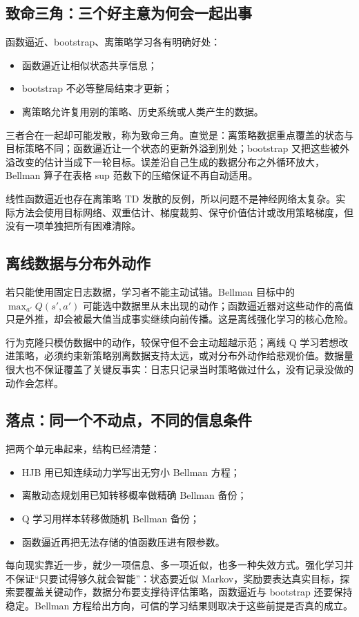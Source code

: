 \subsection{致命三角：三个好主意为何会一起出事}

函数逼近、bootstrap、离策略学习各有明确好处：

\begin{itemize}
\tightlist
\item
  函数逼近让相似状态共享信息；
\item
  bootstrap 不必等整局结束才更新；
\item
  离策略允许复用别的策略、历史系统或人类产生的数据。
\end{itemize}

三者合在一起却可能发散，称为致命三角。直觉是：离策略数据重点覆盖的状态与目标策略不同；函数逼近让一个状态的更新外溢到别处；bootstrap 又把这些被外溢改变的估计当成下一轮目标。误差沿自己生成的数据分布之外循环放大，Bellman 算子在表格 sup 范数下的压缩保证不再自动适用。

线性函数逼近也存在离策略 TD 发散的反例，所以问题不是神经网络太复杂。实际方法会使用目标网络、双重估计、梯度裁剪、保守价值估计或改用策略梯度，但没有一项单独把所有困难清除。

\subsection{离线数据与分布外动作}

若只能使用固定日志数据，学习者不能主动试错。Bellman 目标中的 \(\max_{a'}Q(s',a')\) 可能选中数据里从未出现的动作；函数逼近器对这些动作的高值只是外推，却会被最大值当成事实继续向前传播。这是离线强化学习的核心危险。

行为克隆只模仿数据中的动作，较保守但不会主动超越示范；离线 Q 学习若想改进策略，必须约束新策略别离数据支持太远，或对分布外动作给悲观价值。数据量很大也不保证覆盖了关键反事实：日志只记录当时策略做过什么，没有记录没做的动作会怎样。

\subsection{落点：同一个不动点，不同的信息条件}

把两个单元串起来，结构已经清楚：

\begin{itemize}
\tightlist
\item
  HJB 用已知连续动力学写出无穷小 Bellman 方程；
\item
  离散动态规划用已知转移概率做精确 Bellman 备份；
\item
  Q 学习用样本转移做随机 Bellman 备份；
\item
  函数逼近再把无法存储的值函数压进有限参数。
\end{itemize}

每向现实靠近一步，就少一项信息、多一项近似，也多一种失效方式。强化学习并不保证``只要试得够久就会智能''：状态要近似 Markov，奖励要表达真实目标，探索要覆盖关键动作，数据分布要支撑待评估策略，函数逼近与 bootstrap 还要保持稳定。Bellman 方程给出方向，可信的学习结果则取决于这些前提是否真的成立。
